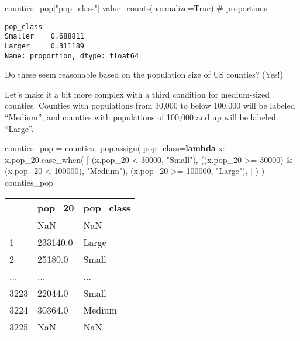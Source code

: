 \documentclass[
  letterpaper,
  DIV=11,
  numbers=noendperiod]{scrreprt}
\newenvironment{Shaded}{\begin{snugshade}}{\end{snugshade}}
\newcommand{\CommentTok}[1]{\textcolor[rgb]{0.37,0.37,0.37}{#1}}
\newcommand{\DecValTok}[1]{\textcolor[rgb]{0.68,0.00,0.00}{#1}}
\newcommand{\KeywordTok}[1]{\textcolor[rgb]{0.00,0.23,0.31}{\textbf{#1}}}
\newcommand{\NormalTok}[1]{\textcolor[rgb]{0.00,0.23,0.31}{#1}}
\newcommand{\OperatorTok}[1]{\textcolor[rgb]{0.37,0.37,0.37}{#1}}
\newcommand{\StringTok}[1]{\textcolor[rgb]{0.13,0.47,0.30}{#1}}
\newcommand{\VariableTok}[1]{\textcolor[rgb]{0.07,0.07,0.07}{#1}}
\begin{document}
\begin{Shaded}
\begin{Highlighting}[]
\NormalTok{counties\_pop[}\StringTok{"pop\_class"}\NormalTok{].value\_counts(normalize}\OperatorTok{=}\VariableTok{True}\NormalTok{) }\CommentTok{\# proportions}
\end{Highlighting}
\end{Shaded}

\begin{verbatim}
pop_class
Smaller    0.688811
Larger     0.311189
Name: proportion, dtype: float64
\end{verbatim}

Do these seem reasonable based on the population size of US counties?
(Yes!)

Let's make it a bit more complex with a third condition for medium-sized
counties. Counties with populations from 30,000 to below 100,000 will be
labeled ``Medium'', and counties with populations of 100,000 and up will
be labeled ``Large''.

\begin{Shaded}
\begin{Highlighting}[]
\NormalTok{counties\_pop }\OperatorTok{=}\NormalTok{ counties\_pop.assign(}
\NormalTok{    pop\_class}\OperatorTok{=}\KeywordTok{lambda}\NormalTok{ x: x.pop\_20.case\_when(}
\NormalTok{        [}
\NormalTok{            (x.pop\_20 }\OperatorTok{\textless{}} \DecValTok{30000}\NormalTok{, }\StringTok{"Small"}\NormalTok{),}
\NormalTok{            ((x.pop\_20 }\OperatorTok{\textgreater{}=} \DecValTok{30000}\NormalTok{) }\OperatorTok{\&}\NormalTok{ (x.pop\_20 }\OperatorTok{\textless{}} \DecValTok{100000}\NormalTok{), }\StringTok{"Medium"}\NormalTok{),}
\NormalTok{            (x.pop\_20 }\OperatorTok{\textgreater{}=} \DecValTok{100000}\NormalTok{, }\StringTok{"Large"}\NormalTok{),}
\NormalTok{        ]}
\NormalTok{    )}
\NormalTok{)}
\NormalTok{counties\_pop}
\end{Highlighting}
\end{Shaded}

\begin{longtable}[]{@{}lll@{}}
\toprule\noalign{}
& pop\_20 & pop\_class \\
\midrule\noalign{}
\endhead
\bottomrule\noalign{}
\endlastfoot
0 & NaN & NaN \\
1 & 233140.0 & Large \\
2 & 25180.0 & Small \\
... & ... & ... \\
3223 & 22044.0 & Small \\
3224 & 30364.0 & Medium \\
3225 & NaN & NaN \\
\end{longtable}
\end{document}
